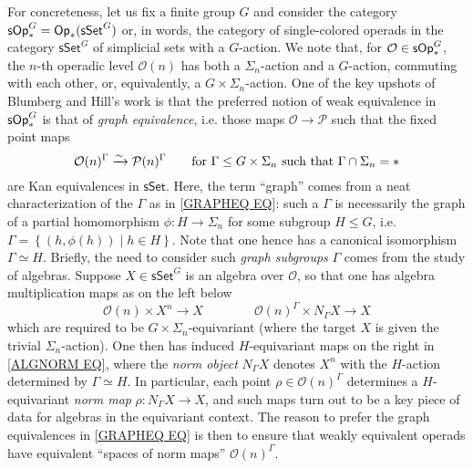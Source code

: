 \documentclass[a4paper,10pt
]{article}%
\numberwithin{equation}{section}
\numberwithin{figure}{section}
\theoremstyle{definition} %
\newcommand{\sets}[2]{\left\{ #1 \;|\; #2\right\}}%
\renewcommand{\O}{\ensuremath{\mathcal O}}
\newcommand{\1}{\ensuremath{\mathbbm 1}}%
\begin{document}
For concreteness, let us fix a finite group $G$
and consider the category
$\mathsf{sOp}^{G}_{\**} = \mathsf{Op}_{\**}(\mathsf{sSet}^G)$
or, in words,
the category of single-colored operads
in the category $\mathsf{sSet}^G$
of simplicial sets with a $G$-action.
We note that, for $\O \in \mathsf{sOp}^{G}_{\**}$,
the $n$-th operadic level $\O(n)$ has both a $\Sigma_n$-action and a $G$-action, commuting with each other, or, equivalently, 
a $G \times \Sigma_n$-action.
One of the key upshots
of Blumberg and Hill's work \cite{BH15}
is that the preferred notion of weak equivalence in $\mathsf{sOp}^{G}_{\**}$
is that of \emph{graph equivalence},
i.e. those maps 
$\O \to \mathcal{P}$
such that the fixed point maps
\begin{equation}\label{GRAPHEQ EQ}
\O(n)^{\Gamma} \xrightarrow{\sim} \mathcal{P}(n)^{\Gamma}
\qquad
\text{for }
\Gamma \leq G \times \Sigma_n
\text{ such that }
\Gamma \cap \Sigma_n = \**
\end{equation}
are Kan equivalences in $\mathsf{sSet}$.
%
Here, the term ``graph'' comes from a neat characterization of the $\Gamma$
as in \eqref{GRAPHEQ EQ}:
such a $\Gamma$ is necessarily the graph of a partial homomorphism
$\phi \colon H \to \Sigma_n$ for some subgroup $H \leq G$,
i.e.
$\Gamma = \sets{(h,\phi(h))}{h \in H}$. 
Note that one hence has a canonical isomorphism $\Gamma \simeq H$.
%
Briefly, the need to consider such \emph{graph subgroups} $\Gamma$ comes from the study of algebras.
Suppose $X \in \mathsf{sSet}^G$ is an algebra over
$\O$,
so that one has algebra multiplication maps
as on the left below
\begin{equation}\label{ALGNORM EQ}
\O(n) \times X^n \to X
\qquad \qquad
\O(n)^{\Gamma} \times N_{\Gamma}X \to X
\end{equation}
which are required to be 
$G \times \Sigma_n$-equivariant
(where the target $X$ is given the trivial $\Sigma_n$-action).
One then has induced 
$H$-equivariant maps 
on the right in \eqref{ALGNORM EQ},
where the \emph{norm object} $N_{\Gamma} X$
denotes $X^{n}$ with the $H$-action determined by $\Gamma \simeq H$.
In particular, each point
$\rho \in \O(n)^{\Gamma}$
determines a $H$-equivariant \emph{norm map}
$\rho \colon N_{\Gamma} X \to X$,  
and such maps turn out to be a key piece of data
for algebras in the equivariant context.
The reason to prefer the graph equivalences in \eqref{GRAPHEQ EQ}
is then to ensure that weakly equivalent operads
have equivalent ``spaces of norm maps'' $\O(n)^{\Gamma}$.
\end{document}
